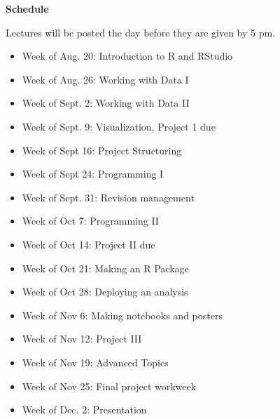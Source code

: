 \documentclass[12pt]{article}
\let\oldtextbf\textbf
\renewcommand{\textbf}[1]{\textcolor{coolblack}{\oldtextbf{#1}}}
\begin{document}
\begin{flushleft}
\textbf{Schedule}
\end{flushleft}

Lectures will be posted the day before they are given by 5 pm.

\begin{itemize}
\item Week of Aug. 20: Introduction to R and RStudio
\item Week of Aug. 26: Working with Data I
\item Week of Sept. 2: Working with Data II
\item Week of Sept. 9: Visualization, Project 1 due
\item Week of Sept 16: Project Structuring 
\item Week of Sept 24: Programming I
\item Week of Sept. 31: Revision management
\item Week of Oct 7: Programming II
\item Week of Oct 14: Project II due
\item Week of Oct 21: Making an R Package
\item Week of Oct 28: Deploying an analysis
\item Week of Nov 6: Making notebooks and posters
\item Week of Nov 12: Project III
\item Week of Nov 19: Advanced Topics
\item Week of Nov 25: Final project workweek
\item Week of Dec. 2: Presentation


\end{itemize}
\end{document}
